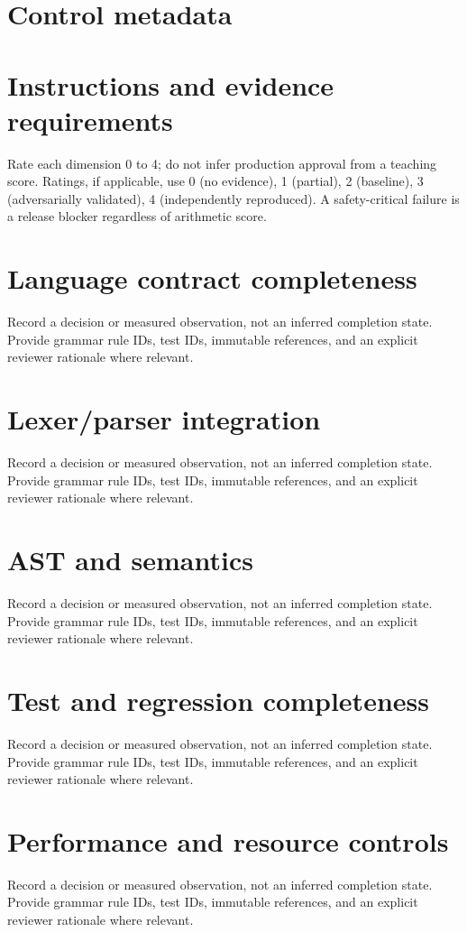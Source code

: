 \documentclass[11pt,letterpaper]{article}
\begin{document}
\makedoctitle\makedocsummary
\tableofcontents\clearpage
\section{Control metadata}
\section{Instructions and evidence requirements}
Rate each dimension 0 to 4; do not infer production approval from a teaching score. Ratings, if applicable, use 0 (no evidence), 1 (partial), 2 (baseline), 3 (adversarially validated), 4 (independently reproduced). A safety-critical failure is a release blocker regardless of arithmetic score.
\section{Language contract completeness}
Record a decision or measured observation, not an inferred completion state. Provide grammar rule IDs, test IDs, immutable references, and an explicit reviewer rationale where relevant.
\PTRating
\section{Lexer/parser integration}
Record a decision or measured observation, not an inferred completion state. Provide grammar rule IDs, test IDs, immutable references, and an explicit reviewer rationale where relevant.
\PTRating
\section{AST and semantics}
Record a decision or measured observation, not an inferred completion state. Provide grammar rule IDs, test IDs, immutable references, and an explicit reviewer rationale where relevant.
\PTRating
\section{Test and regression completeness}
Record a decision or measured observation, not an inferred completion state. Provide grammar rule IDs, test IDs, immutable references, and an explicit reviewer rationale where relevant.
\PTRating
\section{Performance and resource controls}
Record a decision or measured observation, not an inferred completion state. Provide grammar rule IDs, test IDs, immutable references, and an explicit reviewer rationale where relevant.
\PTRating
\end{document}
